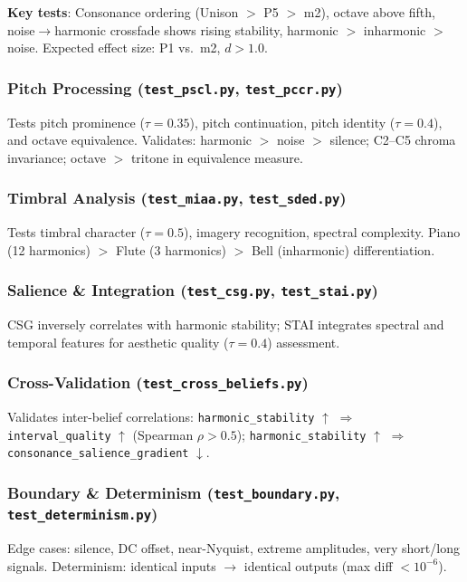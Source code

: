 \documentclass[10pt,twocolumn]{article}
\newcommand{\belief}[1]{\texttt{#1}}
\begin{document}
\textbf{Key tests}: Consonance ordering (Unison $>$ P5 $>$ m2), octave above fifth, noise$\to$harmonic crossfade shows rising stability, harmonic $>$ inharmonic $>$ noise. Expected effect size: P1 vs.\ m2, $d > 1.0$.

\subsubsection{Pitch Processing (\texttt{test\_pscl.py}, \texttt{test\_pccr.py})}
Tests pitch prominence ($\tau\!=\!0.35$), pitch continuation, pitch identity ($\tau\!=\!0.4$), and octave equivalence. Validates: harmonic $>$ noise $>$ silence; C2--C5 chroma invariance; octave $>$ tritone in equivalence measure.

\subsubsection{Timbral Analysis (\texttt{test\_miaa.py}, \texttt{test\_sded.py})}
Tests timbral character ($\tau\!=\!0.5$), imagery recognition, spectral complexity. Piano (12 harmonics) $>$ Flute (3 harmonics) $>$ Bell (inharmonic) differentiation.

\subsubsection{Salience \& Integration (\texttt{test\_csg.py}, \texttt{test\_stai.py})}
CSG inversely correlates with harmonic stability; STAI integrates spectral and temporal features for aesthetic quality ($\tau\!=\!0.4$) assessment.

\subsubsection{Cross-Validation (\texttt{test\_cross\_beliefs.py})}
Validates inter-belief correlations: \belief{harmonic\_stability} $\uparrow$ $\Rightarrow$ \belief{interval\_quality} $\uparrow$ (Spearman $\rho > 0.5$); \belief{harmonic\_stability} $\uparrow$ $\Rightarrow$ \belief{consonance\_salience\_gradient} $\downarrow$.

\subsubsection{Boundary \& Determinism (\texttt{test\_boundary.py}, \texttt{test\_determinism.py})}
Edge cases: silence, DC offset, near-Nyquist, extreme amplitudes, very short/long signals. Determinism: identical inputs $\to$ identical outputs (max diff $< 10^{-6}$).
\end{document}
